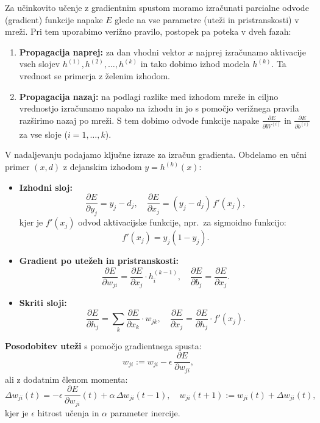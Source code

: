 Za učinkovito učenje z gradientnim spustom moramo izračunati parcialne odvode (gradient) funkcije napake $E$ glede na vse parametre (uteži in pristranskosti) v mreži. Pri tem uporabimo verižno pravilo, postopek pa poteka v dveh fazah:
\begin{enumerate}
  \item \textbf{Propagacija naprej:} za dan vhodni vektor $x$ najprej izračunamo aktivacije vseh slojev $h^{(1)}, h^{(2)}, \dots, h^{(k)}$ in tako dobimo izhod modela $h^{(k)}$. Ta vrednost se primerja z želenim izhodom.
  \item \textbf{Propagacija nazaj:} na podlagi razlike med izhodom mreže in ciljno vrednostjo izračunamo napako na izhodu in jo s pomočjo verižnega pravila razširimo nazaj po mreži. S tem dobimo odvode funkcije napake $\frac{\partial E}{\partial W^{(i)}}$ in $\frac{\partial E}{\partial b^{(i)}}$ za vse sloje ($i = 1, \dots, k$). 
\end{enumerate}

V nadaljevanju podajamo ključne izraze za izračun gradienta. Obdelamo en učni primer $(x, d)$ z dejanskim izhodom $y = h^{(k)}(x)$:

\begin{itemize}
  \item \textbf{Izhodni sloj:}
  \[
  \frac{\partial E}{\partial y_j} = y_j - d_j,
  \quad
  \frac{\partial E}{\partial x_j} = (y_j - d_j)\, f'(x_j),
  \]
  kjer je $f'(x_j)$ odvod aktivacijske funkcije, npr.\ za sigmoidno funkcijo:
  \[
  f'(x_j) = y_j (1 - y_j).
  \]

  \item \textbf{Gradient po utežeh in pristranskosti:}
  \[
  \frac{\partial E}{\partial w_{ji}} = \frac{\partial E}{\partial x_j} \cdot h^{(k-1)}_i,
  \quad
  \frac{\partial E}{\partial b_j} = \frac{\partial E}{\partial x_j}.
  \]

  \item \textbf{Skriti sloji:}
  \[
  \frac{\partial E}{\partial h_j} = \sum_{k} \frac{\partial E}{\partial x_k} \cdot w_{jk},
  \quad
  \frac{\partial E}{\partial x_j} = \frac{\partial E}{\partial h_j} \cdot f'(x_j).
  \]
\end{itemize}

\textbf{Posodobitev uteži} s pomočjo gradientnega spusta:
\[
w_{ji} := w_{ji} - \epsilon \, \frac{\partial E}{\partial w_{ji}},
\]
ali z dodatnim členom momenta:
\[
\Delta w_{ji}(t) = -\epsilon \, \frac{\partial E}{\partial w_{ji}}(t) + \alpha\, \Delta w_{ji}(t-1),
\quad
w_{ji}(t+1) := w_{ji}(t) + \Delta w_{ji}(t),
\]
kjer je $\epsilon$ hitrost učenja in $\alpha$ parameter inercije.

